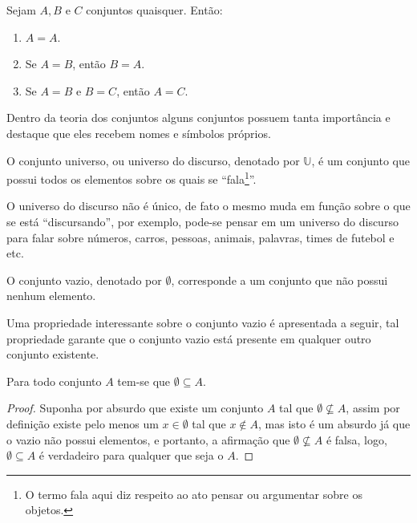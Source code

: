 \newpage
\begin{theorem}
	Sejam $A, B$ e $C$ conjuntos quaisquer. Então:
	\begin{enumerate}
		\item $A = A$.
		\item Se $A = B$, então $B = A$.
		\item Se $A = B$ e $B = C$, então $A = C$.
	\end{enumerate}
\end{theorem}


Dentro da teoria dos conjuntos alguns conjuntos possuem tanta importância e destaque que eles recebem nomes e símbolos próprios. 

\begin{definition}\label{def:ConjuntoUniverso}
	O conjunto universo, ou universo do discurso, denotado por $\mathbb{U}$, é um conjunto que possui todos os elementos sobre os quais se ``fala\footnote{O termo fala aqui diz respeito ao ato pensar ou argumentar sobre os objetos.}''.
\end{definition}

O universo do discurso não é único, de fato o mesmo muda em função sobre o que se está ``discursando'', por exemplo, pode-se pensar em um universo do discurso para falar sobre números, carros, pessoas, animais, palavras, times de futebol e etc.

\begin{definition}\label{def:ConjuntoVazio}
	O conjunto vazio, denotado por $\emptyset$, corresponde a um conjunto que não possui nenhum elemento.
\end{definition} 

Uma propriedade interessante sobre o conjunto vazio é apresentada a seguir, tal propriedade garante que o conjunto vazio está presente em qualquer outro conjunto existente.

\begin{theorem}\label{teo:ConjuntoVazioSubDeTodos}
	Para todo conjunto $A$ tem-se que $\emptyset \subseteq A$.
\end{theorem}

\begin{proof}
	Suponha por absurdo que existe um conjunto $A$ tal que $\emptyset \not\subseteq A$, assim por definição  existe pelo menos um $x \in \emptyset$ tal que $x \notin A$, mas isto é um absurdo já que o vazio não possui elementos, e portanto, a afirmação que $\emptyset \not\subseteq A$ é falsa, logo, $\emptyset \subseteq A$ é verdadeiro para qualquer que seja o $A$.
\end{proof}

